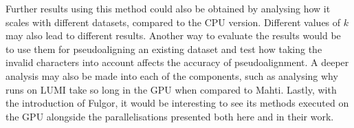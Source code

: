 Further results using this method could also be obtained by analysing how it scales with different datasets, compared to the CPU version.
Different values of $k$ may also lead to different results.
Another way to evaluate the results would be to use them for pseudoaligning an existing dataset and test how taking the invalid characters into account affects the accuracy of pseudoalignment.
A deeper analysis may also be made into each of the components, such as analysing why runs on LUMI take so long in the GPU when compared to Mahti.
Lastly, with the introduction of Fulgor, it would be interesting to see its methods executed on the GPU alongside the parallelisations presented both here and in their work.
